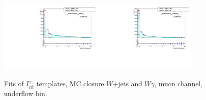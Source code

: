 \begin{figure}[htb]
  \begin{center}
   \includegraphics[width=0.45\textwidth]{../figs/figs_v11/MUON_WGamma/MCclosureWjetsPlusWg/c_TEMPL_CHISO_UNblind__phoEt10to15__Barrel__RooFit_MCclosure.pdf}\includegraphics[width=0.45\textwidth]{../figs/figs_v11/MUON_WGamma/MCclosureWjetsPlusWg/c_TEMPL_CHISO_UNblind__phoEt10to15__Endcap__RooFit_MCclosure.pdf}\\
  \label{fig:templateFits_MCclosureWjetsPlusWg_CHISO_MUON_0}
  \caption{Fits of $I_{ch}^{\gamma}$ templates, MC closure $W$+jets and $W\gamma$, muon channel, underflow bin.}
  \end{center}
\end{figure}

